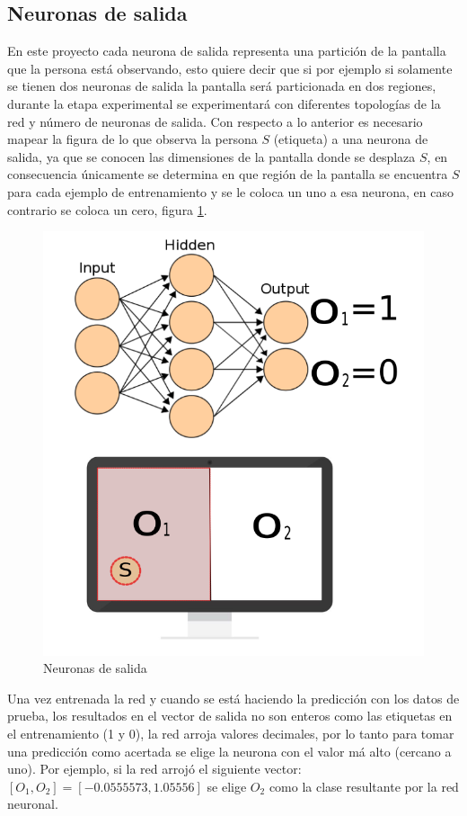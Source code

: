 \subsection{Neuronas de salida}
En este proyecto cada neurona de salida representa una partición de la pantalla que la persona está observando, esto quiere decir que si por ejemplo si solamente se tienen dos neuronas de salida la pantalla será particionada en dos regiones, durante la etapa experimental se experimentará con diferentes topologías de la red y número de neuronas de salida.
Con respecto a lo anterior es necesario mapear la figura de lo que observa la persona $S$ (etiqueta) a una neurona de salida, ya que se conocen las dimensiones de la pantalla donde se desplaza $S$, en consecuencia únicamente se determina en que región de la pantalla se encuentra $S$ para cada ejemplo de entrenamiento y se le coloca un uno a esa neurona, en caso contrario se coloca un cero, figura \ref{fig: outNeu}.\\
		\begin{figure}[htbp]
			\centering
			\includegraphics[width=.5\textwidth]{./pictures/outNeu}
			\caption{Neuronas de salida}\label{fig: outNeu}
		\end{figure}
Una vez entrenada la red y cuando se está haciendo la predicción con los datos de prueba, los resultados en el vector de salida no son enteros como las etiquetas en el entrenamiento (1 y 0), la red arroja valores decimales, por lo tanto para tomar una predicción como acertada se elige la neurona con el valor má alto (cercano a uno). Por ejemplo, si la red arrojó el siguiente vector: $[O_1, O_2]=[-0.0555573, 1.05556]$ se elige $O_2$ como la clase resultante por la red neuronal.




